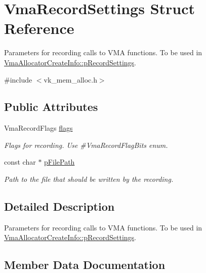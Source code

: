 \hypertarget{structVmaRecordSettings}{}\section{Vma\+Record\+Settings Struct Reference}
\label{structVmaRecordSettings}


Parameters for recording calls to V\+MA functions. To be used in \hyperlink{structVmaAllocatorCreateInfo_ace2aa4877b16a42b0b7673d4e26000ee}{Vma\+Allocator\+Create\+Info\+::p\+Record\+Settings}.  




{\ttfamily \#include $<$vk\+\_\+mem\+\_\+alloc.\+h$>$}

\subsection*{Public Attributes}
\begin{DoxyCompactItemize}
\item 
\mbox{\label{structVmaRecordSettings_ad8fdcc92119ae7a8c08c1a564c01d63a}} 
Vma\+Record\+Flags \hyperlink{structVmaRecordSettings_ad8fdcc92119ae7a8c08c1a564c01d63a}{flags}
\begin{DoxyCompactList}\small\item\em Flags for recording. Use \#\+Vma\+Record\+Flag\+Bits enum. \end{DoxyCompactList}\item 
const char $\ast$ \hyperlink{structVmaRecordSettings_a6cb1fdbf6bcb610b68f2010dd629e89d}{p\+File\+Path}
\begin{DoxyCompactList}\small\item\em Path to the file that should be written by the recording. \end{DoxyCompactList}\end{DoxyCompactItemize}


\subsection{Detailed Description}
Parameters for recording calls to V\+MA functions. To be used in \hyperlink{structVmaAllocatorCreateInfo_ace2aa4877b16a42b0b7673d4e26000ee}{Vma\+Allocator\+Create\+Info\+::p\+Record\+Settings}. 

\subsection{Member Data Documentation}
\mbox{\label{structVmaRecordSettings_a6cb1fdbf6bcb610b68f2010dd629e89d}} 
